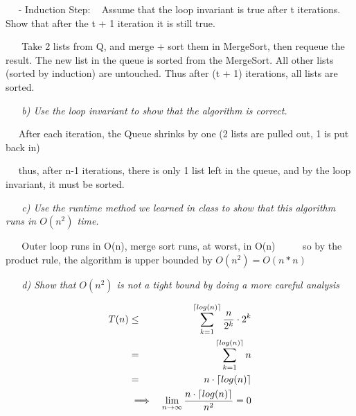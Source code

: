 \documentclass[12pt, letterpaper]{article}
\DeclarePairedDelimiter{\ceil}{\lceil}{\rceil}
\begin{document}
\begin{enumerate}
    \-\ \newline
    \-\ - Induction Step:
    \-\ \textnormal{ Assume that the loop invariant is true after t iterations. Show that after the t + 1 iteration it is still true. }

    \-\ \newline
    \-\ \textnormal { Take 2 lists from Q, and merge + sort them in MergeSort, then requeue the result. The new list in the queue is sorted from the MergeSort. All other lists (sorted by induction) are untouched. Thus after (t + 1) iterations, all lists are sorted. }

    \-\ \newline
    \-\ \newline
    \it{ b) Use the loop invariant to show that the algorithm is correct. }

    \-\ \newline
    \-\ \textnormal{After each iteration, the Queue shrinks by one (2 lists are pulled out, 1 is put back in)}

    \-\ \newline
    \-\ \textnormal{thus, after n-1 iterations, there is only 1 list left in the queue, and by the loop invariant, it must be sorted.}

     \-\ \newline
     \-\ \newline
     \it{ c) Use the runtime method we learned in class to show that this algorithm runs in \(O(n^{2})\) time. }

     \-\ \newline
     \-\ \textnormal{ Outer loop runs in O(n), merge sort runs, at worst, in O(n) }
     \-\ \newline
     \-\ \newline
     \-\ \textnormal{ so by the product rule, the algorithm is upper bounded by \(O(n^{2}) = O(n * n) \) }

     \-\ \newline
     \-\ \newline
     \it{ d) Show that \(O(n^2)\) is not a tight bound by doing a more careful analysis }

     \begin{eqnarray}
        T(n) &\le& \sum_{k=1}^{\ceil{log(n)}} \frac{n}{2^k} \cdot 2^k \\
        &=& \sum_{k=1}^{\ceil{log(n)}} n \\
        &=& n \cdot \ceil{log(n)} \\
        &\implies& \lim_{n \rightarrow \infty} \frac{n \cdot \ceil{log(n)}}{n^2} = 0
    \end{eqnarray}


\end{enumerate}
\end{document}
